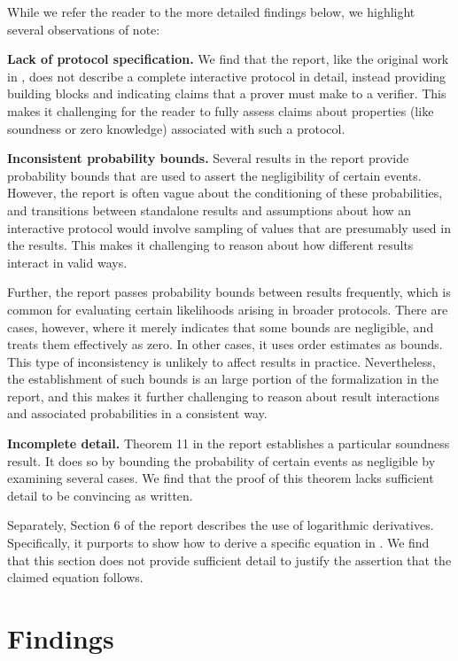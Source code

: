 \documentclass{article}
\begin{document}
While we refer the reader to the more detailed findings below, we highlight several observations of note:

\textbf{Lack of protocol specification.}
We find that the report, like the original work in \cite{ecip}, does not describe a complete interactive protocol in detail, instead providing building blocks and indicating claims that a prover must make to a verifier.
This makes it challenging for the reader to fully assess claims about properties (like soundness or zero knowledge) associated with such a protocol.

\textbf{Inconsistent probability bounds.}
Several results in the report provide probability bounds that are used to assert the negligibility of certain events.
However, the report is often vague about the conditioning of these probabilities, and transitions between standalone results and assumptions about how an interactive protocol would involve sampling of values that are presumably used in the results.
This makes it challenging to reason about how different results interact in valid ways.

Further, the report passes probability bounds between results frequently, which is common for evaluating certain likelihoods arising in broader protocols.
There are cases, however, where it merely indicates that some bounds are negligible, and treats them effectively as zero.
In other cases, it uses order estimates as bounds.
This type of inconsistency is unlikely to affect results in practice.
Nevertheless, the establishment of such bounds is an large portion of the formalization in the report, and this makes it further challenging to reason about result interactions and associated probabilities in a consistent way.

\textbf{Incomplete detail.}
Theorem 11 in the report establishes a particular soundness result.
It does so by bounding the probability of certain events as negligible by examining several cases.
We find that the proof of this theorem lacks sufficient detail to be convincing as written.

Separately, Section 6 of the report describes the use of logarithmic derivatives.
Specifically, it purports to show how to derive a specific equation in \cite{ecip}.
We find that this section does not provide sufficient detail to justify the assertion that the claimed equation follows.


\section{Findings}
\end{document}
